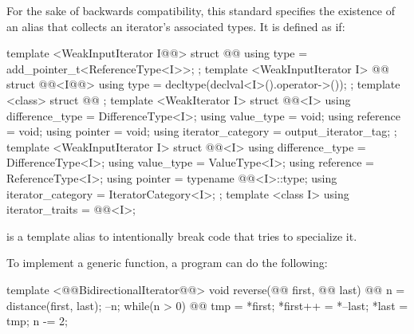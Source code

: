 \begin{addedblock}
\pnum
For the sake of backwards compatibility, this standard specifies the existence of an 
alias that collects an iterator's associated types. It is defined as if:

%
\begin{codeblock}
  template <WeakInputIterator I@@> struct @@ {
    using type = add_pointer_t<ReferenceType<I>>;
  };
  template <WeakInputIterator I>
    @@
  struct @@<I@@> {
    using type = decltype(declval<I>().operator->());
  };
  template <class> struct @@ { };
  template <WeakIterator I> struct @@<I> {
    using difference_type = DifferenceType<I>;
    using value_type = void;
    using reference = void;
    using pointer = void;
    using iterator_category = output_iterator_tag;
  };
  template <WeakInputIterator I> struct @@<I> {
    using difference_type = DifferenceType<I>;
    using value_type = ValueType<I>;
    using reference = ReferenceType<I>;
    using pointer = typename @@<I>::type;
    using iterator_category = IteratorCategory<I>;
  };
  template <class I>
    using iterator_traits = @@<I>;
\end{codeblock}

\pnum
\enternote
{} is a template alias to intentionally break code that tries to specialize
it.
\exitnote

\end{addedblock}

\pnum
\enterexample
To implement a generic
function, a \Cpp program can do the following:

\begin{codeblock}
template <@@BidirectionalIterator@@>
void reverse(@@ first, @@ last) {
  @@ n =
    distance(first, last);
  --n;
  while(n > 0) {
    @@
      tmp = *first;
    *first++ = *--last;
    *last = tmp;
    n -= 2;
  }
}
\end{codeblock}
\exitexample

